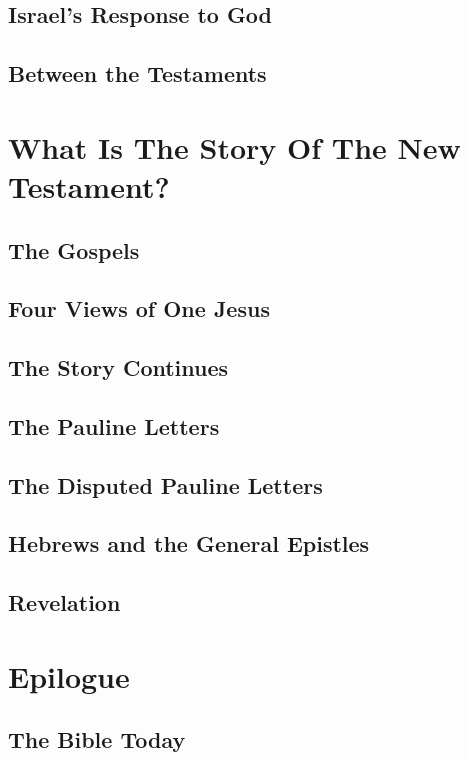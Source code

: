 \documentclass{report}
\begin{document}
    \chapter{Israel's Response to God}
    \chapter{Between the Testaments}

\part{What Is The Story Of The New Testament?}

    \chapter{The Gospels}
    \chapter{Four Views of One Jesus}
    \chapter{The Story Continues}
    \chapter{The Pauline Letters}
    \chapter{The Disputed Pauline Letters}
    \chapter{Hebrews and the General Epistles}
    \chapter{Revelation}

\part{Epilogue}

    \chapter{The Bible Today}
\end{document}

